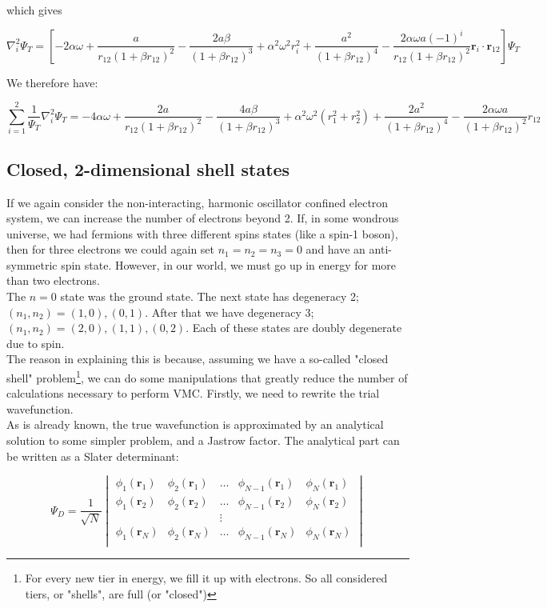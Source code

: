 \documentclass[english, a4paper]{article}
\newcommand{\bm}[1]{\mathbf{#1}}
\begin{document}
	which gives
	
	\begin{equation}
	\nabla_i^2\Psi_T = \left[-2\alpha\omega + \frac{a}{r_{12}(1+\beta r_{12})^2} - \frac{2a\beta}{(1+\beta r_{12})^3} + \alpha^2\omega^2r_i^2 + \frac{a^2}{(1+\beta r_{12})^4} - \frac{2\alpha\omega a(-1)^i}{r_{12}(1+\beta r_{12})^2}\bm{r}_i\cdot\bm{r}_{12}\right] \Psi_T
	\end{equation}
	
	We therefore have:
	
	\begin{equation}
	\sum_{i=1}^2\frac{1}{\Psi_T}\nabla_i^2\Psi_T = -4\alpha\omega + \frac{2a}{r_{12}(1+\beta r_{12})^2} - \frac{4a\beta}{(1+\beta r_{12})^3} + \alpha^2\omega^2(r_1^2 + r_2^2) + \frac{2a^2}{(1+\beta r_{12})^4} - \frac{2\alpha\omega a}{(1+\beta r_{12})^2}r_{12}
	\end{equation}
	
	\subsection{Closed, 2-dimensional shell states}
	If we again consider the non-interacting, harmonic oscillator confined electron system, we can increase the number of electrons beyond 2. If, in some wondrous universe, we had fermions with three different spins states (like a spin-1 boson), then for three electrons we could again set $n_1=n_2=n_3 = 0$ and have an anti-symmetric spin state. However, in our world, we must go up in energy for more than two electrons.\\
	The $n=0$ state was the ground state. The next state has degeneracy 2; $(n_1,n_2) = (1,0), (0,1)$. After that we have degeneracy 3;$(n_1,n_2) = (2,0), (1,1), (0,2)$. Each of these states are doubly degenerate due to spin.\\
	
	The reason in explaining this is because, assuming we have a so-called "closed shell" problem\footnote{For every new tier in energy, we fill it up with electrons. So all considered tiers, or "shells", are full (or "closed")}, we can do some manipulations that greatly reduce the number of calculations necessary to perform VMC. Firstly, we need to rewrite the trial wavefunction.\\
	As is already known, the true wavefunction is approximated by an analytical solution to some simpler problem, and a Jastrow factor. The analytical part can be written as a Slater determinant:
	
	\begin{equation}
	\Psi_{D} = \frac{1}{\sqrt{N}}
	\begin{vmatrix}
	\phi_1(\bm{r}_1) & \phi_2(\bm{r}_1) & \ldots & \phi_{N-1}(\bm{r}_1) & \phi_N(\bm{r}_1)\\
	\phi_1(\bm{r}_2) & \phi_2(\bm{r}_2) & \ldots & \phi_{N-1}(\bm{r}_2) & \phi_N(\bm{r}_2)\\
	& & \vdots & &\\
	\phi_1(\bm{r}_N) & \phi_2(\bm{r}_N) & \ldots & \phi_{N-1}(\bm{r}_N) & \phi_N(\bm{r}_N)\\
	\end{vmatrix}
	\end{equation}
	
\end{document}
